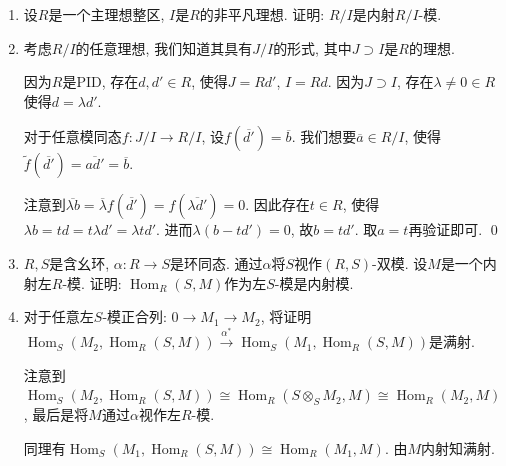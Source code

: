 \begin{enumerate}
        \item[7.6] 设$R$是一个主理想整区, $I$是$R$的非平凡理想. 证明: $R/I$是内射$R/I$-模.
        \item[\textbf{证明:}] 考虑$R/I$的任意理想, 我们知道其具有$J/I$的形式, 
            其中$J\supset I$是$R$的理想.\par
            因为$R$是PID, 存在$d, d'\in R$, 使得$J=Rd'$, $I=Rd$. 
            因为$J\supset I$, 存在$\lambda\neq 0 \in R$使得$d=\lambda d'$.\par
            对于任意模同态$f:J/I\rightarrow R/I$, 设$f(\overline{d'})=\overline{b}$. 
            我们想要$\overline{a}\in R/I$, 使得
            $\tilde{f}(\overline{d'})=\overline{ad'}=\overline{b}$.\par
            注意到$\overline{\lambda b}=\overline{\lambda}f(\overline{d'})
            =f(\overline{\lambda d'})=0.$ 
            因此存在$t\in R$, 使得$\lambda b=td=t\lambda d'=\lambda td'$. 
            进而$\lambda(b-td')=0$, 故$b=td'$. 取$a=t$再验证即可. \qed

        \item[7.7] $R,S$是含幺环, $\alpha:R\rightarrow S$是环同态. 
        通过$\alpha$将$S$视作$(R,S)$-双模. 设$M$是一个内射左$R$-模. 
        证明: $\operatorname{Hom}_R(S,M)$作为左$S$-模是内射模. 
        \item[\textbf{证明:}] 对于任意左$S$-模正合列: 
            $0\rightarrow M_1\rightarrow M_2$, 
            将证明$\operatorname{Hom}_S(M_2,\operatorname{Hom}_R(S,M))
            \stackrel{\alpha^*}{\rightarrow}\operatorname{Hom}_S(M_1,\operatorname{Hom}_R(S,M))$是满射.\par
            注意到$\operatorname{Hom}_S(M_2,\operatorname{Hom}_R(S,M))
            \cong \operatorname{Hom}_R(S\otimes_S M_2,M) 
            \cong \operatorname{Hom}_R(M_2,M)$, 最后是将$M$通过$\alpha$视作左$R$-模.\par
            同理有$\operatorname{Hom}_S(M_1,\operatorname{Hom}_R(S,M))
            \cong \operatorname{Hom}_R(M_1,M)$. 由$M$内射知满射.
        \end{enumerate}

